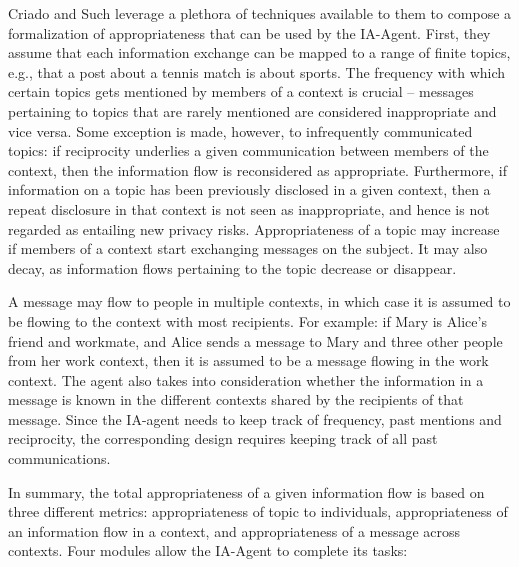\documentclass[../thesis.tex]{subfiles}
\begin{document}
Criado and Such leverage a plethora of techniques available to them to
compose a formalization of appropriateness that can be used by the
IA-Agent. First, they assume that each information exchange can be
mapped to a range of finite topics, e.g., that a post about a tennis
match is about sports. The frequency with which certain topics gets
mentioned by members of a context is crucial -- messages pertaining
to topics that are rarely mentioned are considered inappropriate and
vice versa. Some exception is made, however, to infrequently
communicated topics: if reciprocity underlies a given communication
between members of the context, then the information flow is
reconsidered as appropriate. Furthermore, if information on a topic has
been previously disclosed in a given context, then a repeat disclosure
in that context is not seen as inappropriate, and hence is not regarded
as entailing new privacy risks. Appropriateness of a topic may increase
if members of a context start exchanging messages on the subject. It
may also decay, as information flows pertaining to the topic decrease
or disappear. 

A message may flow to people in multiple contexts, in which case it is
assumed to be flowing to the context with most recipients. For example:
if Mary is Alice's friend and workmate, and Alice sends
a message to Mary and three other people from her work context, then it
is assumed to be a message flowing in the work context. The agent also
takes into consideration whether the information in a message is known
in the different contexts shared by the recipients of that message.
Since the IA-agent needs to keep track of frequency, past mentions and
reciprocity, the corresponding design requires keeping track of all
past communications. 

In summary, the total appropriateness of a given information flow is
based on three different metrics: appropriateness of topic to
individuals, appropriateness of an information flow in a context, and
appropriateness of a message across contexts. Four modules allow the
IA-Agent to complete its tasks: 
\end{document}
